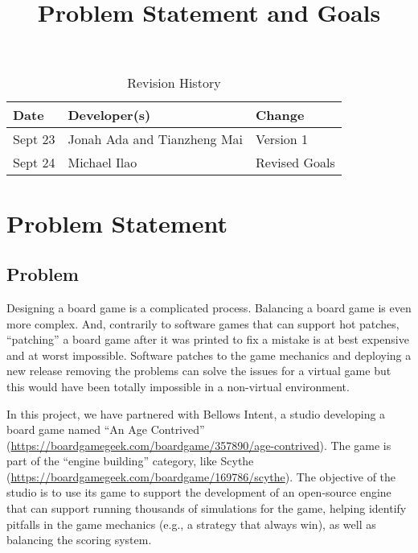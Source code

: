 \documentclass{article}
\title{Problem Statement and Goals\\\progname}
\author{\authname}
\date{}
\begin{document}
\maketitle

\begin{table}[hp]
\caption{Revision History} \label{TblRevisionHistory}
\begin{tabularx}{\textwidth}{llX}
\toprule
\textbf{Date} & \textbf{Developer(s)} & \textbf{Change}\\
\midrule
Sept 23 & Jonah Ada and Tianzheng Mai & Version 1\\
\midrule
Sept 24 & Michael Ilao & Revised Goals\\
\bottomrule
\end{tabularx}
\end{table}

\section{Problem Statement}



\subsection{Problem}
\indent Designing a board game is a complicated process.
Balancing a board game is even more complex. And, contrarily to software games
that can support hot patches, ``patching'' a board game after it was printed to
fix a mistake is at best expensive and at worst impossible.
Software patches to the game mechanics and deploying a new release removing the problems can solve the issues for a virtual game but this would have been totally impossible in a
non-virtual environment.


In this project, we have partnered with Bellows Intent, a studio developing a
board game named ``An Age Contrived''
(\url{https://boardgamegeek.com/boardgame/357890/age-contrived}). The game is
part of the ``engine building'' category, like Scythe
(\url{https://boardgamegeek.com/boardgame/169786/scythe}). The objective of the
studio is to use its game to support the development of an open-source engine
that can support running thousands of simulations for the game, helping identify
pitfalls in the game mechanics (e.g., a strategy that always win), as well as
balancing the scoring system. 
\end{document}
